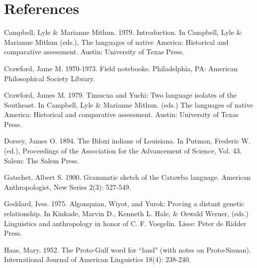 \documentclass[output=paper]{LSP/langsci}
\begin{document}
\section*{References}

\printbibliography 

 

 
 

 


Campbell, Lyle \& Marianne Mithun. 1979. Introduction. In Campbell, Lyle \& Marianne Mithun (eds.), The languages of native America: Historical and comparative assessment.  Austin: University of Texas Press.

 
 



Crawford, Jame M. 1970-1973. Field notebooks. Philadelphia, PA: American Philosophical Society Library.



Crawford, James M. 1979. Timucua and Yuchi: Two language isolates of the Southeast. In Campbell, Lyle \& Marianne Mithun. (eds.) The languages of native America: Historical and comparative assessment.  Austin: University of Texas Press.


 


Dorsey, James O. 1894. The Biloxi indians of Louisiana. In Putman, Frederic W. (ed.), Proceedings of the Association for the Advancement of Science, Vol. 43.  Salem: The Salem Press.

 

 


Gatschet, Albert S. 1900. Grammatic sketch of the Catawba language. American Anthropologist, New Series 2(3): 527-549.


 



Goddard, Ives. 1975. Algonquian, Wiyot, and Yurok: Proving a distant genetic relationship. In Kinkade, Marvin D., Kenneth L. Hale, \& Oswald Werner, (eds.) Linguistics and anthropology in honor of C. F. Voegelin. Lisse: Peter de Ridder Press.


 


Haas, Mary. 1952. The Proto-Gulf word for ``land" (with notes on Proto-Siouan). International Journal of American Linguistics 18(4): 238-240.


 

 

 
 
\end{document}
